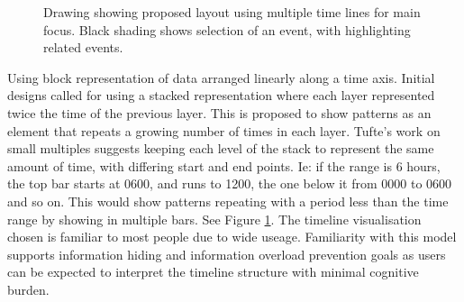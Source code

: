 \begin{figure}[tbh]
\caption{\protect\label{lines}Drawing showing proposed layout using multiple time lines for main focus. Black shading shows selection of an event, with highlighting related events.}
\end{figure}

Using block representation of data arranged linearly along a time axis.
Initial designs called for using a stacked representation where each layer represented twice the time of the previous layer. This is proposed to show patterns as an element that repeats a growing number of times in each layer.
Tufte's work on small multiples \cite{tufte1983visual} suggests keeping each level of the stack to represent the same amount of time, with differing start and end points. Ie: if the range is 6 hours, the top bar starts at 0600, and runs to 1200, the one below it from 0000 to 0600 and so on. This would show patterns repeating with a period less than the time range by showing in multiple bars. See Figure \ref{lines}. The timeline visualisation chosen is familiar to most people due to wide useage. Familiarity with this model supports information hiding and information overload prevention goals as users can be expected to interpret the timeline structure with minimal cognitive burden. 

